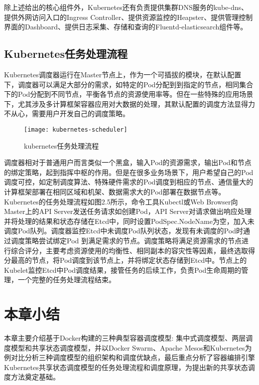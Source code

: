 除上述给出的核心组件外，Kubernetes还有负责提供集群DNS服务的kube-dns、提供外网访问入口的Ingress Controller、提供资源监控的Heapster、提供管理控制界面的Dashboard、提供日志采集、存储和查询的Fluentd-elasticsearch组件等。

\subsection{Kubernetes任务处理流程}
Kubernetes调度器运行在Master节点上，作为一个可插拔的模块，在默认配置下，调度器可以满足大部分的需求，如特定的Pod分配到到指定的节点，相同集合下的Pod分配到不同节点，平衡各节点的资源使用率等。但在一些特殊的应用场景下，尤其涉及多计算框架容器应用对大数据的处理，其默认配置的调度方法显得力不从心，需要用户开发自己的调度策略。
\begin{figure}[H] %
	\centering
	\texttt{[image: kubernetes-scheduler]}
	\caption{kubernetes任务处理流程}
\end{figure}
调度器相对于普通用户而言类似一个黑盒，输入Pod的资源需求，输出Pod和节点的绑定策略，起到指挥中枢的作用。但是在很多业务场景下，用户希望自己的Pod调度可控，如定制调度算法、特殊硬件需求的Pod调度到相应的节点、通信量大的计算框架部署在相同区域和机架、数据需求大的Pod部署在数据节点等。Kubernetes的任务处理流程如图2.5所示，命令工具Kubectl或Web Browser向Master上的API Server发送任务请求如创建Pod，API Server对请求做出响应处理并将处理的结果和状态存储在Etcd中，同时设置PodSpec.NodeName为空，加入未调度Pod队列。调度器监控Etcd中未调度Pod队列状态，发现有未调度的Pod时通过调度策略尝试绑定Pod 到满足需求的节点。调度策略将满足资源需求的节点进行综合评分，主要考虑资源使用的均衡性、相同副本的容灾性等因素，最终选取得分最高的节点，将Pod调度到该节点上，并将绑定状态存储到Etcd中。节点上的Kubelet监控Etcd中Pod调度结果，接管任务的后续工作，负责Pod生命周期的管理，一个完整的任务处理流程结束。

\section{本章小结}

本章主要介绍基于Docker构建的三种典型容器调度模型: 集中式调度模型、两层调度模型和共享状态调度模型，并以Docker Swarm、Apache Mesos和Kubernetes为例对比分析三种调度模型的组织架构和调度优缺点，最后重点分析了容器编排引擎Kubernetes共享状态调度模型的任务处理流程和调度原理，为提出新的共享状态调度方法奠定基础。





